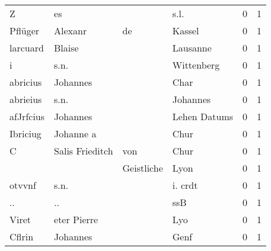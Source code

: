 \begin{tabular}{llllrr}
                        Z &                                 es &             &                                        s.l. &          0 &         1 \\
                  Pflüger &                            Alexanr &          de &                                      Kassel &          0 &         1 \\
                 larcuard &                             Blaise &             &                                    Lausanne &          0 &         1 \\
                        i &                               s.n. &             &                                  Wittenberg &          0 &         1 \\
                 abricius &                           Johannes &             &                                        Char &          0 &         1 \\
                 abrieius &                               s.n. &             &                                    Johannes &          0 &         1 \\
                afJrfcius &                           Johannes &             &                                Lehen Datums &          0 &         1 \\
                 Ibriciug &                          Johanne a &             &                                        Chur &          0 &         1 \\
                        C &                    Salis Frieditch &         von &                                        Chur &          0 &         1 \\
                          &                                    &  Geistliche &                                        Lyon &          0 &         1 \\
                   otvvnf &                               s.n. &             &                                     i. crdt &          0 &         1 \\
                       .. &                                 .. &             &                                         ssB &          0 &         1 \\
                    Viret &                        eter Pierre &             &                                         Lyo &          0 &         1 \\
                   Cflrin &                           Johannes &             &                                        Genf &          0 &         1 \\

\end{tabular}
